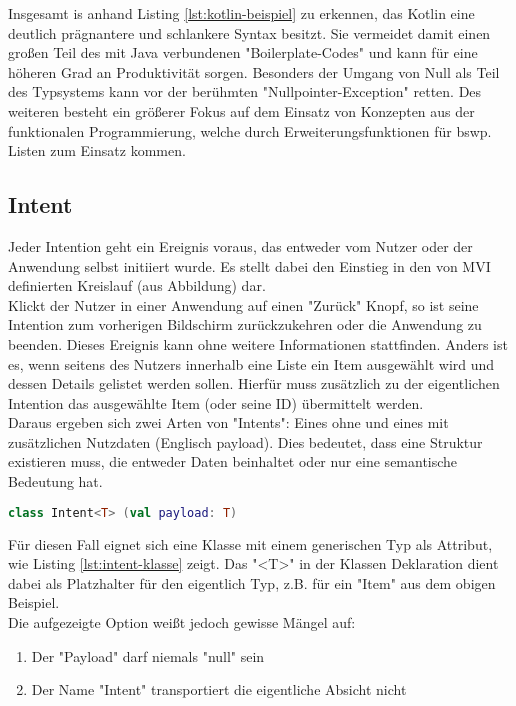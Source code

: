 \bigskip
Insgesamt is anhand Listing
\ref{lst:kotlin-beispiel}
zu erkennen, das Kotlin eine deutlich prägnantere und schlankere Syntax besitzt. Sie vermeidet damit einen großen Teil des mit Java verbundenen "Boilerplate-Codes" und kann für eine höheren Grad an Produktivität sorgen. Besonders der Umgang von Null als Teil des Typsystems kann vor der berühmten "Nullpointer-Exception" retten. Des weiteren besteht ein größerer Fokus auf dem Einsatz von Konzepten aus der funktionalen Programmierung, welche durch Erweiterungsfunktionen für bswp. Listen zum Einsatz kommen.

\subsection{Intent}
Jeder Intention geht ein Ereignis voraus, das entweder vom Nutzer oder der Anwendung selbst initiiert wurde. Es stellt dabei den Einstieg in den von MVI definierten Kreislauf (aus Abbildung) dar. 
\\
Klickt der Nutzer in einer Anwendung auf einen "Zurück" Knopf, so ist seine Intention zum vorherigen Bildschirm zurückzukehren oder die Anwendung zu beenden. Dieses Ereignis kann ohne weitere Informationen stattfinden. Anders ist es, wenn seitens des Nutzers innerhalb eine Liste ein Item ausgewählt wird und dessen Details gelistet werden sollen. Hierfür muss zusätzlich zu der eigentlichen Intention das ausgewählte Item (oder seine ID) übermittelt werden.
\\
Daraus ergeben sich zwei Arten von "Intents": Eines ohne und eines mit zusätzlichen Nutzdaten (Englisch payload). Dies bedeutet, dass eine Struktur existieren muss, die entweder Daten beinhaltet oder nur eine semantische Bedeutung hat.
\begin{lstlisting}[caption={Intent Klasse}, label={lst:intent-klasse}, language=Kotlin]
class Intent<T> (val payload: T)
\end{lstlisting}
\bigskip
Für diesen Fall eignet sich eine Klasse mit einem generischen Typ als Attribut, wie Listing
\ref{lst:intent-klasse}
zeigt. Das "<T>" in der Klassen Deklaration dient dabei als Platzhalter für den eigentlich Typ, z.B. für ein "Item" aus dem obigen Beispiel.
\\
Die aufgezeigte Option weißt jedoch gewisse Mängel auf:
\begin{enumerate}
	\item Der "Payload" darf niemals "null" sein
	\item Der Name "Intent" transportiert die eigentliche Absicht nicht
\end{enumerate}
